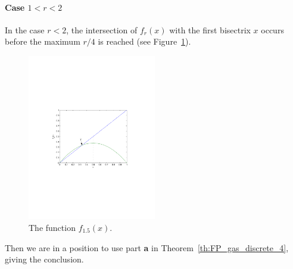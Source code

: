 \paragraph{Case $1<r<2$}
In the case $r<2$, the intersection of $f_r(x)$ with the first bisectrix $x$ occurs before the maximum $r/4$ is reached (see Figure~\ref{fig:logistic_1dot5}).
\begin{figure}[htbp]
\begin{center}
\includegraphics[width=0.5\textwidth]{../figs_02_population_growth/logistic_1dot5}
\end{center}
\caption{The function $f_{1.5}(x)$.}\label{fig:logistic_1dot5}
\end{figure}
Then we are in a position to use part {\bf a} in Theorem~\ref{th:FP_gas_discrete_4}, giving the conclusion.


